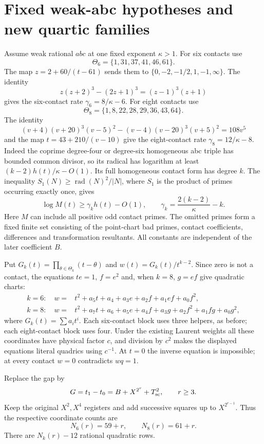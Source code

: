 \documentclass[11pt,a4paper]{article}
\begin{document}
\section{Fixed weak-abc hypotheses and new quartic families}
Assume weak rational $abc$ at one fixed exponent $\kappa>1$.
For six contacts use
\[
 \Theta_6=\{1,31,37,41,46,61\}.
\]
The map $z=2+60/(t-61)$ sends them to
$\{0,-2,-1/2,1,-1,\infty\}$. The identity
\[
 z(z+2)^3-(2z+1)^3=(z-1)^3(z+1)
\]
gives the six-contact rate $\gamma_6=8/\kappa-6$.
For eight contacts use
\[
 \Theta_8=\{1,8,22,28,29,36,43,64\}.
\]
The identity
\[
 (v+4)(v+20)^3(v-5)^2-(v-4)(v-20)^3(v+5)^2=108v^5
\]
and the map $t=43+210/(v-10)$ give the eight-contact rate
$\gamma_8=12/\kappa-8$.
Indeed the coprime degree-four or degree-six homogeneous abc triple
has bounded common divisor, so its radical has logarithm at least
$(k-2)h(t)/\kappa-O(1)$. Its full homogeneous contact form has degree
$k$. The inequality $S_1(N)\ge\operatorname{rad}(N)^2/|N|$, where
$S_1$ is the product of primes occurring exactly once, gives
\begin{equation}\label{eq:rate}
 \log M(t)\ge\gamma_kh(t)-O(1),\qquad
 \gamma_k=\frac{2(k-2)}\kappa-k.
\end{equation}
Here $M$ can include all positive odd contact primes. The omitted
primes form a fixed finite set consisting of the point-chart bad primes,
contact coefficients, differences and transformation resultants.
All constants are independent of the later coefficient $B$.

Put $G_k(t)=\prod_{\theta\in\Theta_k}(t-\theta)$ and
$w(t)=G_k(t)/t^{k-2}$. Since zero is not a contact, the equations
$te=1$, $f=e^2$ and, when $k=8$, $g=ef$ give quadratic charts:
\[
\begin{split}
 k=6:\quad w={}&t^2+a_5t+a_4+a_3e+a_2f+a_1ef+a_0f^2,\\
 k=8:\quad w={}&t^2+a_7t+a_6+a_5e+a_4f+a_3g+a_2f^2+a_1fg+a_0g^2,
\end{split}
\]
where $G_k(t)=\sum a_it^i$. Each six-contact block uses three
helpers, as before; each eight-contact block uses four.
Under the existing Laurent weights all these coordinates have physical
factor $c$, and division by $c^2$ makes the displayed equations literal
quadrics using $c^{-1}$. At $t=0$ the inverse equation is impossible;
at every contact $w=0$ contradicts $wq=1$.

Replace the gap by
\[
             G=t_1-t_0=B+X^{2^r}+T_{\rm sc}^2,\qquad r\ge3.
\]
Keep the original $X^2,X^4$ registers and add successive squares up to
$X^{2^{r-1}}$. Thus the respective coordinate counts are
\begin{equation}\label{eq:count}
                  N_6(r)=59+r,\qquad N_8(r)=61+r.
\end{equation}
There are $N_k(r)-12$ rational quadratic rows.
\end{document}
